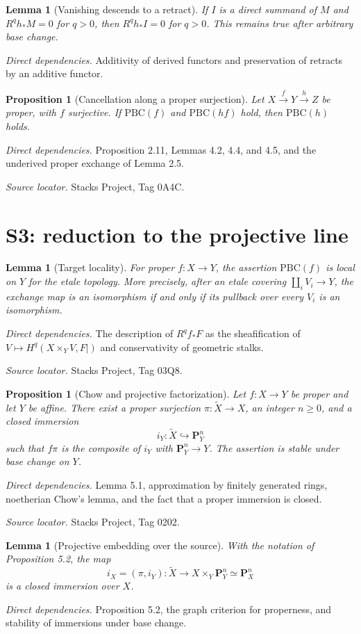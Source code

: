 \documentclass[10pt]{article}
\newtheorem{proposition}[theorem]{Proposition}
\newtheorem{lemma}[theorem]{Lemma}
\theoremstyle{definition}
\newcommand{\deps}[1]{\par\smallskip\textit{Direct dependencies.} #1\par}
\newcommand{\sources}[1]{\par\textit{Source locator.} #1\par}
\begin{document}
\begin{lemma}[Vanishing descends to a retract]
If $I$ is a direct summand of $M$ and $R^qh_*M=0$ for $q>0$, then
$R^qh_*I=0$ for $q>0$.  This remains true after arbitrary base change.
\end{lemma}
\deps{Additivity of derived functors and preservation of retracts by an
additive functor.}

\begin{proposition}[Cancellation along a proper surjection]
Let $X\xrightarrow{f}Y\xrightarrow{h}Z$ be proper, with $f$ surjective.
If $\mathrm{PBC}(f)$ and $\mathrm{PBC}(hf)$ hold, then
$\mathrm{PBC}(h)$ holds.
\end{proposition}
\deps{Proposition 2.11, Lemmas 4.2, 4.4, and 4.5, and the underived
proper exchange of Lemma 2.5.}
\sources{Stacks Project, Tag 0A4C.}

\section{S3: reduction to the projective line}

\begin{lemma}[Target locality]
For proper $f:X\to Y$, the assertion $\mathrm{PBC}(f)$ is local on $Y$ for
the etale topology.  More precisely, after an etale covering
$\coprod_iV_i\to Y$, the exchange map is an isomorphism if and only if its
pullback over every $V_i$ is an isomorphism.
\end{lemma}
\deps{The description of $R^qf_*F$ as the sheafification of
$V\mapsto H^q(X\times_YV,F|)$ and conservativity of geometric stalks.}
\sources{Stacks Project, Tag 03Q8.}

\begin{proposition}[Chow and projective factorization]
Let $f:X\to Y$ be proper and let $Y$ be affine.  There exist a proper
surjection $\pi:\widetilde X\to X$, an integer $n\geq0$, and a closed
immersion
\[
 i_Y:\widetilde X\hookrightarrow\mathbf P^n_Y
\]
such that $f\pi$ is the composite of $i_Y$ with
$\mathbf P^n_Y\to Y$.  The assertion is stable under base change on $Y$.
\end{proposition}
\deps{Lemma 5.1, approximation by finitely generated rings, noetherian
Chow's lemma, and the fact that a proper immersion is closed.}
\sources{Stacks Project, Tag 0202.}

\begin{lemma}[Projective embedding over the source]
With the notation of Proposition 5.2, the map
\[
 i_X=(\pi,i_Y):\widetilde X\longrightarrow
 X\times_Y\mathbf P^n_Y\simeq\mathbf P^n_X
\]
is a closed immersion over $X$.
\end{lemma}
\deps{Proposition 5.2, the graph criterion for properness, and stability of
immersions under base change.}
\end{document}
